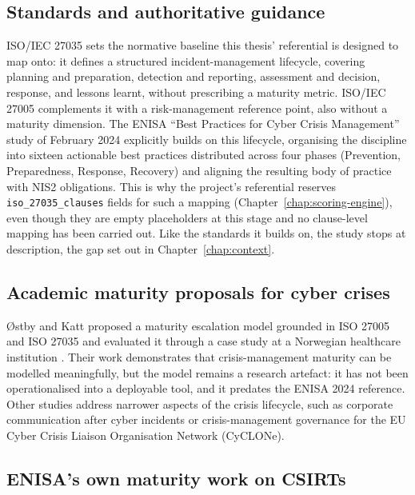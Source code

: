 \subsection{Standards and authoritative guidance}
\label{sec:soa-standards-guidance}

ISO/IEC 27035 \cite{iso27035_2023} sets the normative baseline this thesis' referential is designed to map onto: it defines a structured incident-management lifecycle, covering planning and preparation, detection and reporting, assessment and decision, response, and lessons learnt, without prescribing a maturity metric. ISO/IEC 27005 \cite{iso27005_2022} complements it with a risk-management reference point, also without a maturity dimension. The ENISA ``Best Practices for Cyber Crisis Management'' study of February 2024 \cite{enisa_crisis_mgmt_2024} explicitly builds on this lifecycle, organising the discipline into sixteen actionable best practices distributed across four phases (Prevention, Preparedness, Response, Recovery) and aligning the resulting body of practice with NIS2 obligations. This is why the project's referential reserves \texttt{iso\_27035\_clauses} fields for such a mapping (Chapter~\ref{chap:scoring-engine}), even though they are empty placeholders at this stage and no clause-level mapping has been carried out. Like the standards it builds on, the study stops at description, the gap set out in Chapter~\ref{chap:context}.

\subsection{Academic maturity proposals for cyber crises}
\label{sec:soa-academic-proposals}

Østby and Katt proposed a maturity escalation model grounded in ISO 27005 and ISO 27035 and evaluated it through a case study at a Norwegian healthcare institution \cite{ostby2020maturity}. Their work demonstrates that crisis-management maturity can be modelled meaningfully, but the model remains a research artefact: it has not been operationalised into a deployable tool, and it predates the ENISA 2024 reference. Other studies address narrower aspects of the crisis lifecycle, such as corporate communication after cyber incidents \cite{knight2020framework} or crisis-management governance for the EU Cyber Crisis Liaison Organisation Network (CyCLONe).

\subsection{ENISA's own maturity work on CSIRTs}
\label{sec:soa-enisa-csirt}


